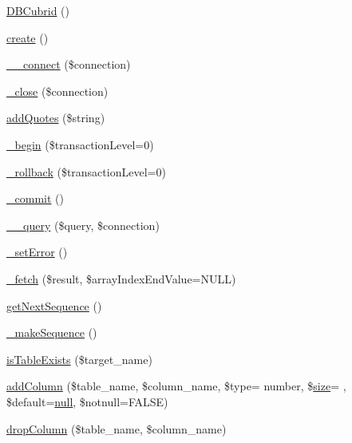 \begin{DoxyCompactItemize}
\item 
\hyperlink{classDBCubrid_ad17912f5a76c00f761e32178f634581e}{D\+B\+Cubrid} ()
\item 
\hyperlink{classDBCubrid_a9a5f425a0abce46d33a6d713b7dd407f}{create} ()
\item 
\hyperlink{classDBCubrid_aa0798dadf20548b2c38e925f391c72f2}{\+\_\+\+\_\+connect} (\$connection)
\item 
\hyperlink{classDBCubrid_ab1a7b718fc864d7b5992cd99abfe2690}{\+\_\+close} (\$connection)
\item 
\hyperlink{classDBCubrid_ab9aea745152a86b3852101aa3225f26d}{add\+Quotes} (\$string)
\item 
\hyperlink{classDBCubrid_a4982cdf2544caf63427258ba5d03ef83}{\+\_\+begin} (\$transaction\+Level=0)
\item 
\hyperlink{classDBCubrid_ac1173f02246bee40975fe2a96973abd0}{\+\_\+rollback} (\$transaction\+Level=0)
\item 
\hyperlink{classDBCubrid_ac8cce69fb6939b2383eb03214ff2522b}{\+\_\+commit} ()
\item 
\hyperlink{classDBCubrid_a2319e8c887147d9596e096088ff67c6a}{\+\_\+\+\_\+query} (\$query, \$connection)
\item 
\hyperlink{classDBCubrid_aaf7dd65f4cdfea9903ab641163058936}{\+\_\+set\+Error} ()
\item 
\hyperlink{classDBCubrid_abb95044521be20a8b2ba105ab623b4d9}{\+\_\+fetch} (\$result, \$array\+Index\+End\+Value=N\+U\+LL)
\item 
\hyperlink{classDBCubrid_a56780e480de62dfca8d67c7bccb4791c}{get\+Next\+Sequence} ()
\item 
\hyperlink{classDBCubrid_ac91bfc1859aaeb1a8d7a58e56829d4de}{\+\_\+make\+Sequence} ()
\item 
\hyperlink{classDBCubrid_aa88914b97476deb6c292a44bff2f2f40}{is\+Table\+Exists} (\$target\+\_\+name)
\item 
\hyperlink{classDBCubrid_a10207e248b4aa36b60cf4adacfb44889}{add\+Column} (\$table\+\_\+name, \$column\+\_\+name, \$type= \textquotesingle{}number\textquotesingle{}, \$\hyperlink{jquery-1_8x_8js_afa6806c6ee5e63d5177f1dcc082ba6bc}{size}= \textquotesingle{}\textquotesingle{}, \$default=\hyperlink{modernizr_8min_8js_a286f9ec831c5e676eeb493248eab9575}{null}, \$notnull=F\+A\+L\+SE)
\item 
\hyperlink{classDBCubrid_ad0b269d73617c6de8b3135ee36ae43d2}{drop\+Column} (\$table\+\_\+name, \$column\+\_\+name)
\item 

\end{DoxyCompactItemize}
